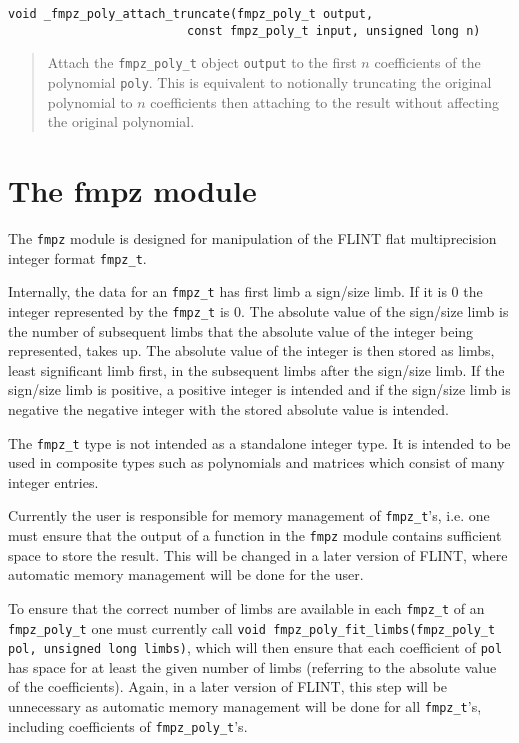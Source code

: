 \documentclass[a4paper,10pt]{article}
\newcommand{\code}{\lstinline}
\begin{document}
\begin{lstlisting}
void _fmpz_poly_attach_truncate(fmpz_poly_t output, 
                         const fmpz_poly_t input, unsigned long n)
\end{lstlisting}
\begin{quote}
Attach the \code{fmpz_poly_t} object \code{output} to the first $n$ coefficients of the polynomial \code{poly}. This is equivalent to notionally truncating the original polynomial to $n$ coefficients then attaching to the result without affecting the original polynomial.
\end{quote}

\section{The fmpz module}
The \code{fmpz} module is designed for manipulation of the FLINT flat multiprecision integer format \code{fmpz_t}. 

Internally, the data for an \code{fmpz_t} has first limb a sign/size limb. If it is 0 the integer represented by the \code{fmpz_t} is 0. The absolute value of the sign/size limb is the number of subsequent limbs that the absolute value of the integer being represented, takes up. The absolute value of the integer is then stored as limbs, least significant limb first, in the subsequent limbs after the sign/size limb. If the sign/size limb is positive, a positive integer is intended and if the sign/size limb is negative the negative integer with the stored absolute value is intended.

The \code{fmpz_t} type is not intended as a standalone integer type. It is intended to be used in composite types such as polynomials and matrices which consist of many integer entries. 

Currently the user is responsible for memory management of \code{fmpz_t}'s, i.e. one must ensure that the output of a function in the \code{fmpz} module contains sufficient space to store the result. This will be changed in a later version of FLINT, where automatic memory management will be done for the user. 

To ensure that the correct number of limbs are available in each \code{fmpz_t} of an \code{fmpz_poly_t} one must currently call \code{void fmpz_poly_fit_limbs(fmpz_poly_t pol, unsigned long limbs)}, which will then ensure that each coefficient of \code{pol} has space for at least the given number of limbs (referring to the absolute value of the coefficients). Again, in a later version of FLINT, this step will be unnecessary as automatic memory management will be done for all \code{fmpz_t}'s, including coefficients of \code{fmpz_poly_t}'s.
\end{document}
